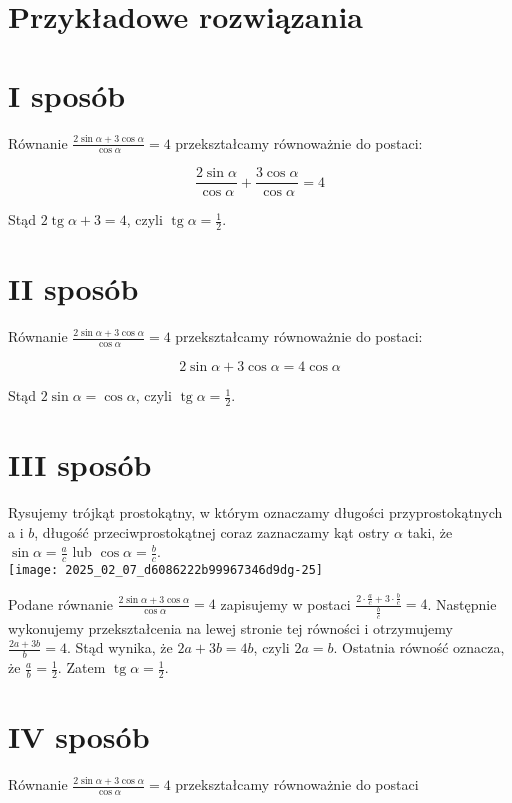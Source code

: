\documentclass[10pt]{article}
\begin{document}
\section*{Przykładowe rozwiązania}
\section*{I sposób}
Równanie $\frac{2 \sin \alpha+3 \cos \alpha}{\cos \alpha}=4$ przekształcamy równoważnie do postaci:

$$
\frac{2 \sin \alpha}{\cos \alpha}+\frac{3 \cos \alpha}{\cos \alpha}=4
$$

Stąd $2 \operatorname{tg} \alpha+3=4$, czyli $\operatorname{tg} \alpha=\frac{1}{2}$.

\section*{II sposób}
Równanie $\frac{2 \sin \alpha+3 \cos \alpha}{\cos \alpha}=4$ przekształcamy równoważnie do postaci:

$$
2 \sin \alpha+3 \cos \alpha=4 \cos \alpha
$$

Stąd $2 \sin \alpha=\cos \alpha$, czyli $\operatorname{tg} \alpha=\frac{1}{2}$.

\section*{III sposób}
Rysujemy trójkąt prostokątny, w którym oznaczamy długości przyprostokątnych a i $b$, długość przeciwprostokątnej coraz zaznaczamy kąt ostry $\alpha$ taki, że $\sin \alpha=\frac{a}{c}$ lub $\cos \alpha=\frac{b}{c}$.\\
\texttt{[image: 2025\_02\_07\_d6086222b99967346d9dg-25]}

Podane równanie $\frac{2 \sin \alpha+3 \cos \alpha}{\cos \alpha}=4$ zapisujemy w postaci $\frac{2 \cdot \frac{a}{c}+3 \cdot \frac{b}{c}}{\frac{b}{c}}=4$. Następnie wykonujemy przekształcenia na lewej stronie tej równości i otrzymujemy $\frac{2 a+3 b}{b}=4$. Stąd wynika, że $2 a+3 b=4 b$, czyli $2 a=b$. Ostatnia równość oznacza, że $\frac{a}{b}=\frac{1}{2}$. Zatem $\operatorname{tg} \alpha=\frac{1}{2}$.

\section*{IV sposób}
Równanie $\frac{2 \sin \alpha+3 \cos \alpha}{\cos \alpha}=4$ przekształcamy równoważnie do postaci
\end{document}
